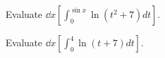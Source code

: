 \documentclass{ximera}
\author{Nela Lakos \and Kyle Parsons}
\begin{document}
\begin{exercise}

Evaluate $\dd{x}\left[\int_0^{\sin x} \ln\left(t^2+7\right) dt\right]$.
\begin{multipleChoice}
\end{multipleChoice}

Evaluate $\dd{x}\left[\int_0^4 \ln(t+7) dt\right]$.
\begin{multipleChoice}
\end{multipleChoice}

\end{exercise}
\end{document}
